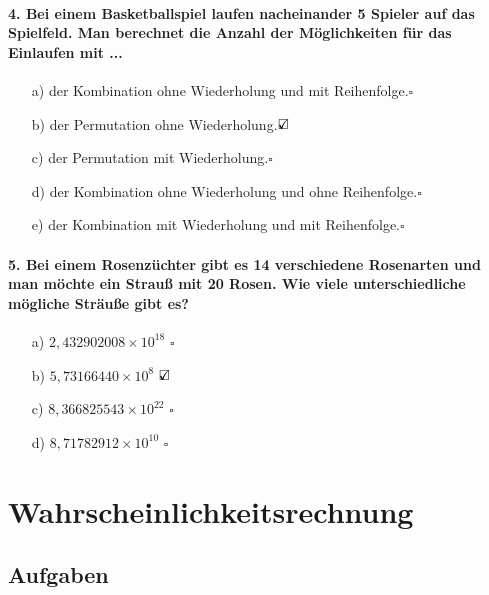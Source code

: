 \documentclass[a4paper]{article}
\begin{document}
\paragraph{4. Bei einem Basketballspiel laufen nacheinander 5 Spieler auf das Spielfeld. Man berechnet die Anzahl der Möglichkeiten für das Einlaufen mit ...}
\begin{itemize}
    \item[a)] der Kombination ohne Wiederholung und mit Reihenfolge.\hfill $\square$
    \item[b)] der Permutation ohne Wiederholung.\hfill $\text{\rlap{$\checkmark$}}\square$
    \item[c)] der Permutation mit Wiederholung.\hfill $\square$
    \item[d)] der Kombination ohne Wiederholung und ohne Reihenfolge.\hfill $\square$
    \item[e)] der Kombination mit Wiederholung und mit Reihenfolge.\hfill $\square$
\end{itemize}

\paragraph{5. Bei einem Rosenzüchter gibt es 14 verschiedene Rosenarten und man möchte ein Strauß mit 20 Rosen. Wie viele unterschiedliche mögliche Sträuße gibt es?}
\begin{itemize}
    \item[a)] $2,432902008 \times 10^{18}$ \hfill $\square$
    \item[b)] $5,73166440 \times 10^8$ \hfill $\text{\rlap{$\checkmark$}}\square$
    \item[c)] $8,366825543 \times 10^{22}$ \hfill $\square$
    \item[d)] $8,71782912 \times 10^{10}$ \hfill $\square$
\end{itemize}


\clearpage


\section{Wahrscheinlichkeitsrechnung}\label{chap:wkeit}

\subsection{Aufgaben}
\end{document}
